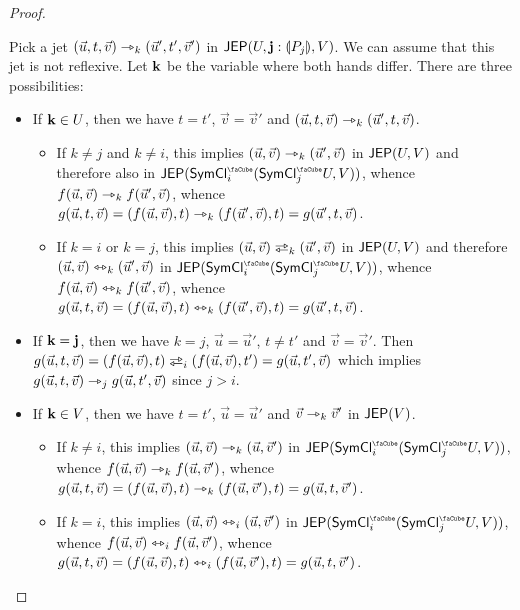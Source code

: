 \documentclass[a4paper]{memoir}
\begin{document}
\begin{proof}
\begin{itemize}
		Pick a jet $(\vec u, t, \vec v) \rightarrowtriangle_k (\vec u', t', \vec v')$ in $\mathsf{JEP}(U, \mathbf{j} : {\llparenthesis P_j \rrparenthesis}, V)$.
		We can assume that this jet is not reflexive.
		Let $\mathbf{k}$ be the variable where both hands differ.
		There are three possibilities:
		\begin{itemize}
			\item If $\mathbf{k} \in U$, then we have $t = t'$, $\vec v = \vec v'$ and $(\vec u, t, \vec v) \rightarrowtriangle_k (\vec u', t, \vec v)$.
			\begin{itemize}
				\item If $k \neq j$ and $k \neq i$, this implies $(\vec u, \vec v) \rightarrowtriangle_k (\vec u', \vec v)$ in $\mathsf{JEP}(U, V)$ and therefore also in $\JEP(\UFsymcube_i(\UFsymcube_j U, V))$, whence $f(\vec u, \vec v) \rightarrowtriangle_k f(\vec u', \vec v)$, whence $g(\vec u, t, \vec v) = (f(\vec u, \vec v), t) \rightarrowtriangle_k (f(\vec u', \vec v), t) = g(\vec u', t, \vec v)$.
				\item If $k = i$ or $k = j$, this implies $(\vec u, \vec v) \infrajet_k (\vec u', \vec v)$ in $\mathsf{JEP}(U, V)$ and therefore $(\vec u, \vec v) \leftrightarrowtriangle_k (\vec u', \vec v)$ in $\JEP(\UFsymcube_i(\UFsymcube_j U, V))$, whence $f(\vec u, \vec v) \leftrightarrowtriangle_k f(\vec u', \vec v)$, whence $g(\vec u, t, \vec v) = (f(\vec u, \vec v), t) \leftrightarrowtriangle_k (f(\vec u', \vec v), t) = g(\vec u', t, \vec v)$.
			\end{itemize}
			\item If $\mathbf{k} = \mathbf{j}$, then we have $k = j$, $\vec u = \vec u'$, $t \neq t'$ and $\vec v = \vec v'$. Then $g(\vec u, t, \vec v) = (f(\vec u, \vec v), t) \infrajet_i (f(\vec u, \vec v), t') = g(\vec u, t', \vec v)$ which implies $g(\vec u, t, \vec v) \rightarrowtriangle_j g(\vec u, t', \vec v)$ since $j > i$.
			\item If $\mathbf{k} \in V$, then we have $t = t'$, $\vec u = \vec u'$ and $\vec v \rightarrowtriangle_k \vec v'$ in $\mathsf{JEP}(V)$.
			\begin{itemize}
				\item If $k \neq i$, this implies $(\vec u, \vec v) \rightarrowtriangle_k (\vec u, \vec v')$ in $\JEP(\UFsymcube_i(\UFsymcube_j U, V))$, whence $f(\vec u, \vec v) \rightarrowtriangle_k f(\vec u, \vec v')$, whence $g(\vec u, t, \vec v) = (f(\vec u, \vec v), t) \rightarrowtriangle_k (f(\vec u, \vec v'), t) = g(\vec u, t, \vec v')$.
				\item If $k = i$, this implies $(\vec u, \vec v) \leftrightarrowtriangle_i (\vec u, \vec v')$ in $\JEP(\UFsymcube_i(\UFsymcube_j U, V))$, whence $f(\vec u, \vec v) \leftrightarrowtriangle_i f(\vec u, \vec v')$, whence $g(\vec u, t, \vec v) = (f(\vec u, \vec v), t) \leftrightarrowtriangle_i (f(\vec u, \vec v'), t) = g(\vec u, t, \vec v')$.
			\end{itemize}
		\end{itemize}
		

\end{itemize}
\end{proof}
\end{document}

